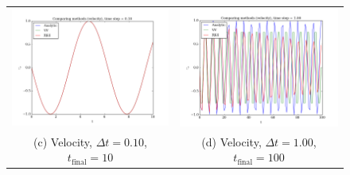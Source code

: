 \documentclass{article}
\begin{document}
\begin{multicols}{2}
\begin{figure}
\begin{center}
\begin{tabular}{cc}
	  \includegraphics[width=90mm]{Images/comparison_v_01.png}
	& \includegraphics[width=90mm]{Images/comparison_v_1.png} \\
	(c) Velocity, $\Delta t = 0.10$, $t_{\mathrm{final}} = 10$				& (d) Velocity, $\Delta t = 1.00$, $t_{\mathrm{final}} = 100$  \\[6pt]
	

\end{tabular}
\end{center}
\end{figure}
\end{multicols}
\end{document}
